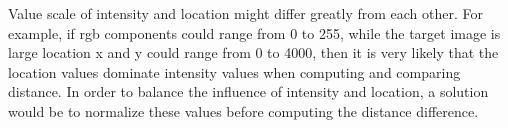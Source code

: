 \documentclass[a4paper, 10pt]{article}
\begin{document}
Value scale of intensity and location might differ greatly from each other. For example, if rgb components could range from 0 to 255, while the target image is large location x and y could range from 0 to 4000, then it is very likely that the location values dominate intensity values when computing and comparing distance. In order to balance the influence of intensity and location, a solution would be to normalize these values before computing the distance difference.
\end{document}
